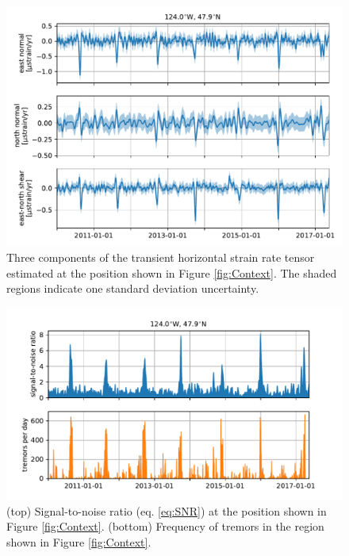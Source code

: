 \documentclass[extra,mreferee]{gji}
\begin{document}
\begin{figure}
\includegraphics{figures/strain_ts/strain-ts.pdf}
\caption{Three components of the transient horizontal strain rate tensor estimated at the position shown in Figure \ref{fig:Context}. The shaded regions indicate one standard deviation uncertainty.}   
\label{fig:StrainTs}
\end{figure}

\begin{figure}
\includegraphics{figures/strain_ts/mag-ts.pdf}
\caption{(top) Signal-to-noise ratio (eq. \ref{eq:SNR}) at the position shown in Figure \ref{fig:Context}. (bottom) Frequency of tremors in the region shown in Figure \ref{fig:Context}.}   
\label{fig:StrainMag}
\end{figure}
\end{document}
